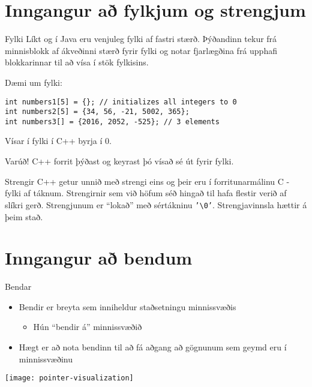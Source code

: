 \documentclass[handout]{beamer}
\begin{document}
\section{Inngangur að fylkjum og strengjum}

\begin{frame}[fragile]{Fylki}
    Líkt og í Java eru venjuleg fylki af fastri stærð. Þýðandinn tekur frá minnisblokk af ákveðinni stærð fyrir fylki og notar fjarlægðina frá upphafi blokkarinnar til að vísa í stök fylkisins.

    Dæmi um fylki:
    \begin{verbatim}
int numbers1[5] = {}; // initializes all integers to 0
int numbers2[5] = {34, 56, -21, 5002, 365};
int numbers3[] = {2016, 2052, -525}; // 3 elements
    \end{verbatim}
    Vísar í fylki í C++ byrja í 0.

\end{frame}

\begin{frame}{Varúð!}
    C++ forrit þýðast og keyrast þó vísað sé út fyrir fylki.
\end{frame}

\begin{frame}{Strengir}
    C++ getur unnið með strengi eins og þeir eru í forritunarmálinu C - fylki af táknum. Strengirnir sem við höfum séð hingað til hafa flestir verið af slíkri gerð.
    Strengjunum er ``lokað'' með sértákninu \texttt{'\textbackslash0'}. Strengjavinnsla hættir á þeim stað.
\end{frame}

\section{Inngangur að bendum}

\begin{frame}{Bendar}
\begin{itemize}
 \item Bendir er breyta sem inniheldur staðsetningu minnissvæðis
 \begin{itemize}
  \item Hún ``bendir á'' minnissvæðið
 \end{itemize}
 \item Hægt er að nota bendinn til að fá aðgang að gögnunum sem geymd eru í minnissvæðinu
\end{itemize}
\begin{center}
\texttt{[image: pointer-visualization]}
\end{center}
\end{frame}
\end{document}
